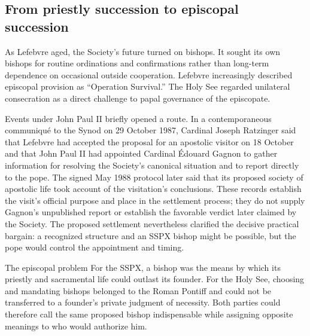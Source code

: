 \subsection{From priestly succession to episcopal succession}

As Lefebvre aged, the Society's future turned on bishops. It sought its own bishops for routine ordinations and confirmations rather than long-term dependence on occasional outside cooperation. Lefebvre increasingly described episcopal provision as ``Operation Survival.'' The Holy See regarded unilateral consecration as a direct challenge to papal governance of the episcopate.

Events under John Paul II briefly opened a route. In a contemporaneous communiqué to the Synod on 29 October 1987, Cardinal Joseph Ratzinger said that Lefebvre had accepted the proposal for an apostolic visitor on 18 October and that John Paul II had appointed Cardinal Édouard Gagnon to gather information for resolving the Society's canonical situation and to report directly to the pope. The signed May 1988 protocol later said that its proposed society of apostolic life took account of the visitation's conclusions. These records establish the visit's official purpose and place in the settlement process; they do not supply Gagnon's unpublished report or establish the favorable verdict later claimed by the Society. The proposed settlement nevertheless clarified the decisive practical bargain: a recognized structure and an SSPX bishop might be possible, but the pope would control the appointment and timing.

\begin{studybox}{The episcopal problem}
For the SSPX, a bishop was the means by which its priestly and sacramental life could outlast its founder. For the Holy See, choosing and mandating bishops belonged to the Roman Pontiff and could not be transferred to a founder's private judgment of necessity. Both parties could therefore call the same proposed bishop indispensable while assigning opposite meanings to who would authorize him.
\end{studybox}
